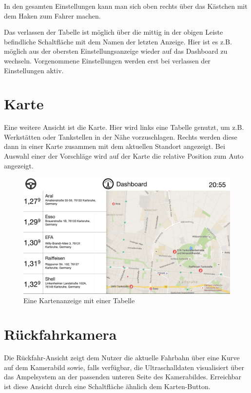 \documentclass[pflichtenheft.tex]{subfiles}
\begin{document}
In den gesamten Einstellungen kann man sich oben rechts über das Kästchen mit dem Haken zum Fahrer machen.

Das verlassen der Tabelle ist möglich über die mittig in der obigen Leiste befindliche Schaltfläche mit dem Namen der letzten Anzeige. Hier ist es z.B. möglich aus der obersten Einstellungsanzeige wieder auf das Dashboard zu wechseln. Vorgenommene Einstellungen werden erst bei verlassen der Einstellungen aktiv.  


\clearpage
\section{Karte}
\label{sec:Karte}

Eine weitere Ansicht ist die Karte. Hier wird links eine Tabelle genutzt, um z.B. Werkstätten oder Tankstellen in der Nähe vorzuschlagen. Rechts werden diese dann in einer Karte zusammen mit dem aktuellen Standort angezeigt.
Bei Auswahl einer der Vorschläge wird auf der Karte die relative Position zum Auto angezeigt.
\begin{figure}[H]
  	\begin{center}
 		\includegraphics[width=\textwidth]{Images/GUI-Map.png}
  		\caption{Eine Kartenanzeige mit einer Tabelle}
  	\end{center}
\end{figure}

\clearpage
\section{Rückfahrkamera}

Die Rückfahr-Ansicht zeigt dem Nutzer die aktuelle Fahrbahn über eine Kurve auf dem Kamerabild sowie, falls verfügbar, die Ultraschalldaten visualisiert über das Ampelsystem an der passenden unteren Seite des Kamerabildes. Erreichbar ist diese Ansicht durch eine Schaltfläche ähnlich dem Karten-Button.
\end{document}
